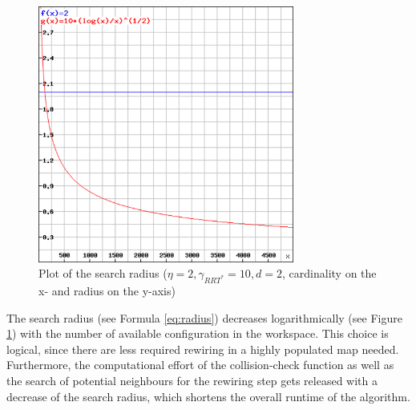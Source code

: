 \begin{figure} [h]
	\centering
	\includegraphics[width=0.75\textwidth]{images/radius.png}
	\caption{Plot of the search radius ($\eta=2,\gamma_{RRT^{*}}=10,d=2$, cardinality on the x- and radius on the y-axis)}
	\label{pics:radius}
\end{figure}

The search radius (see Formula \ref{eq:radius}) decreases logarithmically (see Figure \ref{pics:radius}) with the number of available configuration in the workspace. This choice is logical, since there are less required rewiring in a highly populated map needed. Furthermore, the computational effort of the collision-check function as well as the search of potential neighbours for the rewiring step gets released with a decrease of the search radius, which shortens the overall runtime of the algorithm.   

